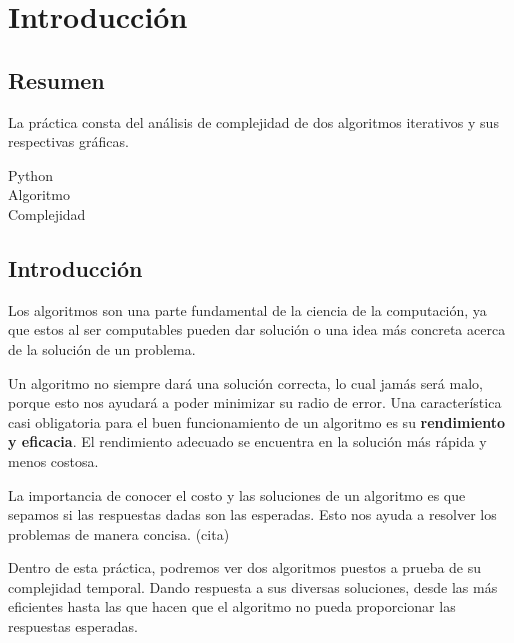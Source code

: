 
\chapter{Introducción}



\section{Resumen}
    La práctica consta del análisis de complejidad de dos algoritmos iterativos y sus respectivas gráficas.

    \begin{description}
        \item [Python]
        \item [Algoritmo]
        \item [Complejidad]
    \end{description}

\section{Introducción}
    Los algoritmos son una parte fundamental de la ciencia de la computación, ya que estos al ser computables pueden dar solución o una idea más concreta acerca de la solución de un problema.
    
    Un algoritmo no siempre dará una solución correcta, lo cual jamás será malo, porque esto nos ayudará a poder minimizar su radio de error. Una característica casi obligatoria para el buen funcionamiento de un algoritmo es su \textbf{rendimiento y eficacia}. El rendimiento adecuado se encuentra en la solución más rápida y menos costosa. \cite{Algorithm}
    
    La importancia de conocer el costo y las soluciones de un algoritmo es que sepamos si las respuestas dadas son las esperadas. Esto nos ayuda a resolver los problemas de manera concisa. (cita)
    
    Dentro de esta práctica, podremos ver dos algoritmos puestos a prueba de su complejidad temporal. Dando respuesta a sus diversas soluciones, desde las más eficientes hasta las que hacen que el algoritmo no pueda proporcionar las respuestas esperadas. 
